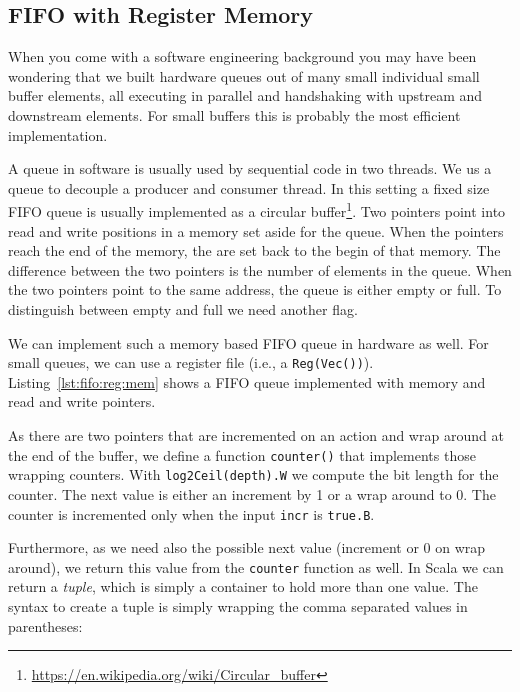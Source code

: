 \documentclass[%
    10pt,
    headinclude, footexclude,
    openright, %
    notitlepage,
    cleardoubleempty,
    headsepline,
    pointlessnumbers,
    bibtotoc, idxtotoc,
    ]{scrbook}
\newcommand{\code}[1]{{\lstinline[basicstyle=\small\ttfamily]{#1}}}
\newcommand{\myref}[2]{\href{#1}{#2}}
\renewcommand{\myref}[2]{{#2}{\footnote{\url{#1}}}}
\begin{document}
\subsection{FIFO with Register Memory}

When you come with a software engineering background you may have been
wondering that we built hardware queues out of many small individual small buffer
elements, all executing in parallel and handshaking with upstream and downstream
elements. For small buffers this is probably the most efficient implementation.

A queue in software is usually used by sequential code in two threads.
We us a queue to decouple a producer and consumer thread.
In this setting a fixed size FIFO queue is usually implemented as a
\myref{https://en.wikipedia.org/wiki/Circular_buffer}{circular buffer}.
Two pointers point into read and write positions in a memory set aside
for the queue. When the pointers reach the end of the memory, the
are set back to the begin of that memory. The difference between the two
pointers is the number of elements in the queue. When the two pointers
point to the same address, the queue is either empty or full.
To distinguish between empty and full we need another flag.

We can implement such a memory based FIFO queue in hardware as
well. For small queues, we can use a register file (i.e., a \code{Reg(Vec())}).
Listing~\ref{lst:fifo:reg:mem} shows a FIFO queue implemented with  memory
and read and write pointers.

\newpage
{}

As there are two pointers that are incremented on an
action and wrap around at the end of the buffer, we define a function \code{counter()}
that implements those wrapping counters. With \code{log2Ceil(depth).W} we
compute the bit length for the counter. The next value is either an increment by
1 or a wrap around to 0.
The counter is incremented only when the input \code{incr} is \code{true.B}.

Furthermore, as we need also the
possible next value (increment or 0 on wrap around), we return this value from
the \code{counter} function as well. In Scala we can return a \emph{tuple},
which is simply a container to hold more than one value. The syntax to create
a tuple is simply wrapping the comma separated values in parentheses:
\end{document}
